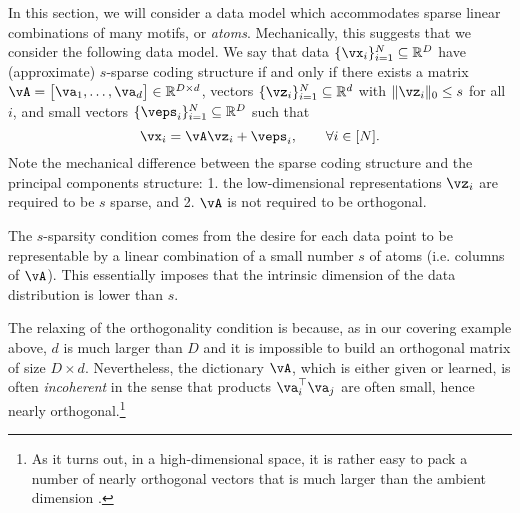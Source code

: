 \documentclass[../../book-main.tex]{subfiles}
\begin{document}
In this section, we will consider a data model which accommodates sparse linear combinations of many motifs, or \textit{atoms}. Mechanically, this suggests that we consider the following data model. We say that data \(\{\vx_{i}\}_{i = 1}^{N} \subseteq \R^{D}\) have (approximate) \(s\)-sparse coding structure if and only if there exists a matrix \(\vA = \mat{\va_{1}, \dots, \va_{d}} \in \R^{D \times d}\), vectors \(\{\vz_{i}\}_{i = 1}^{N} \subseteq \R^{d}\) with \(\norm{\vz_{i}}_{0} \leq s\) for all \(i\), and small vectors \(\{\veps_{i}\}_{i = 1}^{N} \subseteq \R^{D}\) such that
\begin{equation}\label{eq:vectorized_sparse_dl_dgp}
    \vx_{i} = \vA\vz_{i} + \veps_{i}, \qquad \forall i \in [N].
\end{equation}
Note the mechanical difference between the sparse coding structure and the principal components structure: 1. the low-dimensional representations \(\vz_{i}\) are required to be \(s\) sparse, and 2. \(\vA\) is not required to be orthogonal. 

The \(s\)-sparsity condition comes from the desire for each data point to be representable by a linear combination of a small number \(s\) of atoms (i.e. columns of \(\vA\)). This essentially imposes that the intrinsic dimension of the data distribution is lower than \(s\).

The relaxing of the orthogonality condition is because, as in our covering example above, \(d\) is much larger than \(D\) and it is impossible to build an orthogonal matrix of size \(D \times d\). Nevertheless, the dictionary \(\vA\), which is either given or learned, is often \textit{incoherent} in the sense that products \(\va_{i}^{\top}\va_{j}\) are often small, hence nearly orthogonal.\footnote{As it turns out, in a high-dimensional space, it is rather easy to pack a number of nearly orthogonal vectors that is much larger than the ambient dimension \cite{Wright-Ma-2022}. } 
\end{document}
